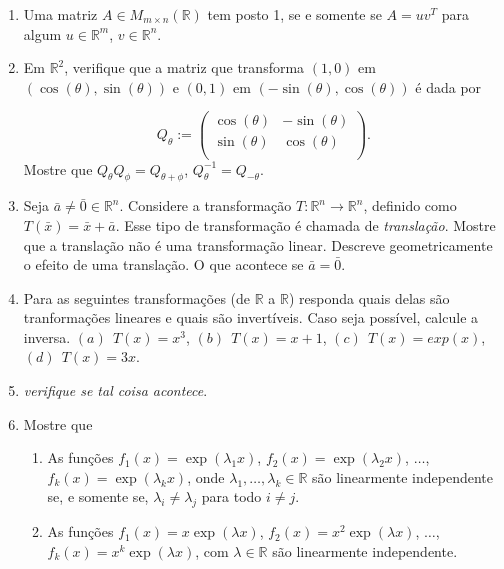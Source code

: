 \documentclass{article}
\theoremstyle{plain}
\theoremstyle{obs}
\numberwithin{equation}{section}
\begin{document}
\begin{enumerate}
       \item Uma matriz $A \in M_{m\times n}(\mathbb{R})$
       tem posto 1, se e somente se $A=uv^{T}$ para algum $u \in \mathbb{R}^{m}$, 
       $v \in \mathbb{R}^{n}$.
 
    \item Em $\mathbb{R}^{2}$, verifique que a matriz que transforma 
    $(1,0)$ em $(\cos(\theta), \sin(\theta))$ e 
    $(0,1)$ em $(-\sin(\theta), \cos(\theta))$ é dada por 
    
    $$ Q_{\theta}:=
       \begin{pmatrix}
       \cos(\theta) & -\sin(\theta)\\
       \sin(\theta) & \cos(\theta) \\
       \end{pmatrix}.
    $$
    Mostre que $Q_{\theta}Q_{\phi}=Q_{\theta+\phi}$, $Q_{\theta}^{-1}=Q_{-\theta}$. %
    
    \item Seja $\bar{a}\neq\bar{0} \in \mathbb{R}^{n}$.
    Considere a transformação $T:\mathbb{R}^{n}\rightarrow \mathbb{R}^{n}$, 
    definido como $T(\bar{x})=\bar{x}+\bar{a}$.
    Esse tipo de transformação é chamada de {\it translação}.
    Mostre que a translação não é uma transformação linear. Descreve geometricamente
    o efeito de uma translação. O que acontece se $\bar{a}=\bar{0}$.
        
    \item Para as seguintes transformações (de $\mathbb{R}$ a $\mathbb{R}$)
    responda quais delas são tranformações lineares e  
    quais são invertíveis. Caso seja possível, calcule a inversa.
     $(a)\ \  T(x)=x^3$, $(b) \ \ T(x)=x+1$, $(c) \ \ T(x)=exp(x)$, $(d) \ \ T(x)=3x$.    
    
    \item {\it verifique se tal coisa acontece}.

    \item Mostre que 
        \begin{enumerate}
        \item        
        As funções 
        $f_1(x)=\exp(\lambda_1 x)$, 
        $f_2(x)=\exp(\lambda_2 x)$, 
        $\dots$,  
        $f_k(x)=\exp(\lambda_k x)$, onde 
        $\lambda_1,\dots, \lambda_k \in \mathbb{R}$
        são linearmente independente se, e somente se, 
        $\lambda_i \neq \lambda_j$ para todo $i \neq j$.
        \item   As funções $f_1(x)=x\exp(\lambda x)$, 
        $f_2(x)=x^2 \exp(\lambda x)$, 
        $\dots$,  
        $f_k(x)=x^k \exp(\lambda x)$, com  
        $\lambda \in \mathbb{R}$ são linearmente independente. 
        \end{enumerate} 
        

\end{enumerate}
\end{document}
